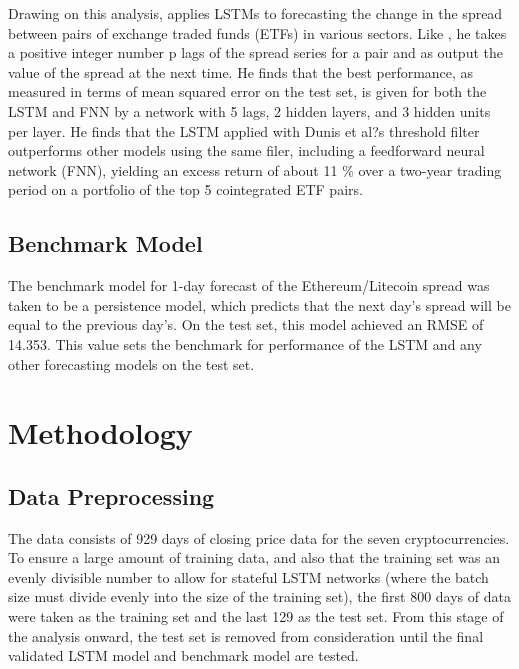 \documentclass{article}
\begin{document}
Drawing on this analysis, \cite{van2017pairs} applies LSTMs to forecasting the change in the spread between pairs of exchange traded funds (ETFs) in various sectors. Like \cite{dunis2006modelling}, he takes a positive integer number p lags of the spread series for a pair and as output the value of the spread at the next time. He finds that the best performance, as measured in terms of mean squared error on the test set, is given for both the LSTM and FNN by a network with 5 lags, 2 hidden layers, and 3 hidden units per layer. He finds that the LSTM applied with Dunis et al?s threshold filter outperforms other models using the same filer, including a feedforward neural network (FNN), yielding an excess return of about 11 \% over a two-year trading period on a portfolio of the top 5 cointegrated ETF pairs. 

\subsection{Benchmark Model}

The benchmark model for 1-day forecast of the Ethereum/Litecoin spread was taken to be a persistence model, which predicts that the next day's spread will be equal to the previous day's. 
On the test set, this model achieved an RMSE of 14.353. This value sets the benchmark for performance of the LSTM and any other forecasting models on the test set. 


\section{Methodology}

\subsection{Data Preprocessing}

The data consists of 929 days of closing price data for the seven cryptocurrencies. To ensure a large amount of training data, and also that the training set was an evenly divisible number to allow for stateful LSTM networks (where the batch size must divide evenly into the size of the training set), the first 800 days of data were taken as the training set and the last 129 as the test set. From this stage of the analysis onward, the test set is removed from consideration until the final validated LSTM model and benchmark model are tested. 
\end{document}
